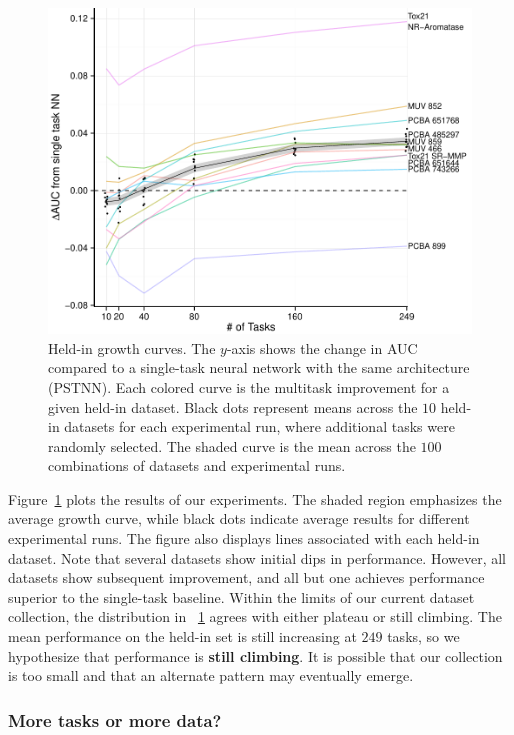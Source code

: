 \begin{figure}[ht]
\centering
\includegraphics[width=\linewidth]{Images/held_in.pdf}
\caption{Held-in growth curves. The $y$-axis shows the change in AUC
  compared to a single-task neural network with the same architecture
  (PSTNN).  Each colored curve is the multitask improvement for a given
  held-in dataset. Black dots represent means across the $10$ held-in
  datasets for each experimental run, where additional tasks were randomly
  selected.  The shaded curve is the mean across the $100$ combinations of
  datasets and experimental runs.}
\label{fig:held-in}
\end{figure}

Figure~\ref{fig:held-in} plots the results of our experiments. The shaded
region emphasizes the average growth curve, while black dots indicate
average results for different experimental runs. The figure also displays
lines associated with each held-in dataset. Note that several datasets show
initial dips in performance. However, all datasets show subsequent
improvement, and all but one achieves performance superior to the
single-task baseline. Within the limits of our current dataset collection,
the distribution in \figurename~\ref{fig:held-in} agrees with either
plateau or still climbing. The mean performance on the held-in set is still
increasing at $249$ tasks, so we hypothesize that performance is
\textbf{still climbing}. It is possible that our collection is too small
and that an alternate pattern may eventually emerge.

\subsubsection{More tasks or more data?}

